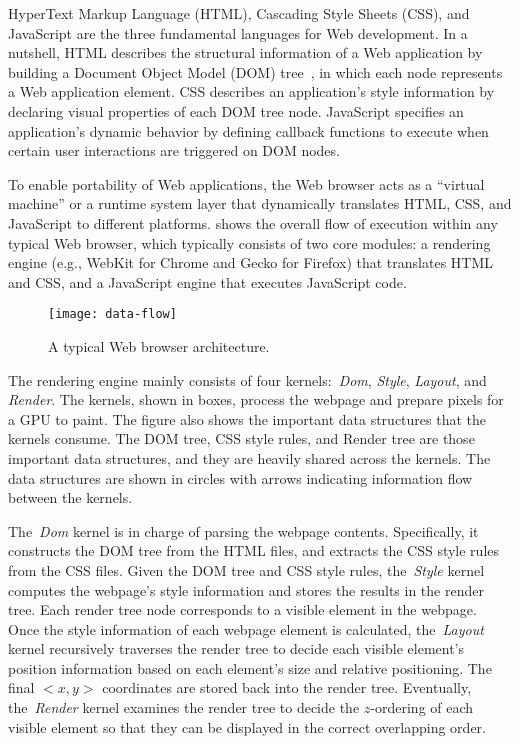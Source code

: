 HyperText Markup Language (HTML), Cascading Style Sheets (CSS), and JavaScript are the three fundamental languages for Web development. In a nutshell, HTML describes the structural information of a Web application by building a Document Object Model (DOM) tree~\cite{DOM}, in which each node represents a Web application element. CSS describes an application's style information by declaring visual properties of each DOM tree node. JavaScript specifies an application's dynamic behavior by defining callback functions to execute when certain user interactions are triggered on DOM nodes.

To enable portability of Web applications, the Web browser acts as a ``virtual machine'' or a runtime system layer that dynamically translates HTML, CSS, and JavaScript to different platforms.  shows the overall flow of execution within any typical Web browser, which typically consists of two core modules: a rendering engine (e.g., WebKit for Chrome and Gecko for Firefox) that translates HTML and CSS, and a JavaScript engine that executes JavaScript code.

\begin{figure}[t]
\centering
\texttt{[image: data-flow]}
\caption{\small{A typical Web browser architecture.}}
\label{fig:data-flow}
\end{figure}

The rendering engine mainly consists of four kernels:~\textit{Dom}, \textit{Style}, \textit{Layout}, and \textit{Render}. The kernels, shown in boxes, process the webpage and prepare pixels for a GPU to paint. The figure also shows the important data structures that the kernels consume. The DOM tree, CSS style rules, and Render tree are those important data structures, and they are heavily shared across the kernels. The data structures are shown in circles with arrows indicating information flow between the kernels. 

The~\textit{Dom} kernel is in charge of parsing the webpage contents. Specifically, it constructs the DOM tree from the HTML files, and extracts the CSS style rules from the CSS files. Given the DOM tree and CSS style rules, the~\textit{Style} kernel computes the webpage's style information and stores the results in the render tree. Each render tree node corresponds to a visible element in the webpage. Once the style information of each webpage element is calculated, the~\textit{Layout} kernel recursively traverses the render tree to decide each visible element's position information based on each element's size and relative positioning. The final $<x, y>$ coordinates are stored back into the render tree. Eventually, the~\textit{Render} kernel examines the render tree to decide the $z$-ordering of each visible element so that they can be displayed in the correct overlapping order.

